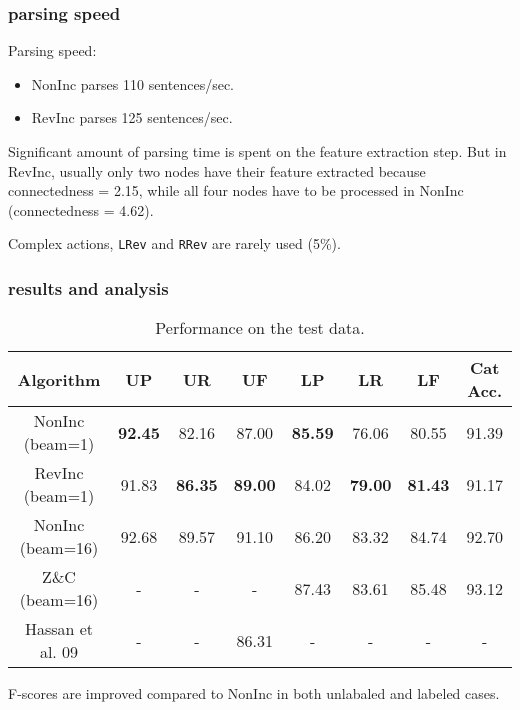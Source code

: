 \documentclass[10pt,usepdftitle=false,hyperref={unicode}]{beamer}
\begin{document}
\begin{frame}
    \frametitle{parsing speed}
    Parsing speed:
    \begin{itemize}
        \item NonInc parses 110 sentences/sec.
        \item RevInc parses 125 sentences/sec.
    \end{itemize}

    \bigskip

    Significant amount of parsing time is spent on the feature extraction step.
    But in RevInc, usually only two nodes have their feature extracted because connectedness = 2.15,
    while all four nodes have to be processed in NonInc (connectedness = 4.62).

    \smallskip

    Complex actions, \texttt{LRev} and \texttt{RRev} are rarely used (5\%).
\end{frame}

\begin{frame}
    \frametitle{results and analysis}
    \begingroup
    \scriptsize
    \begin{center}
    \begin{table}
        \caption{Performance on the test data.}
        \begin{tabular}{cccccccc}
            \toprule
            Algorithm        & UP             & UR             & UF             & LP             & LR             & LF             & Cat Acc. \\
            \midrule
            NonInc (beam=1)  & \textbf{92.45} & 82.16          & 87.00          & \textbf{85.59} & 76.06          & 80.55          & 91.39 \\
            RevInc (beam=1)  & 91.83          & \textbf{86.35} & \textbf{89.00} & 84.02          & \textbf{79.00} & \textbf{81.43} & 91.17 \\
            \midrule
            NonInc (beam=16) & 92.68          & 89.57          & 91.10          & 86.20          & 83.32          & 84.74          & 92.70 \\
            Z\&C (beam=16)   & -              & -              & -              & 87.43          & 83.61          & 85.48          & 93.12 \\
            Hassan et al. 09 & -              & -              & 86.31          & -              & -              & -              & -     \\
            \bottomrule
        \end{tabular}
    \end{table}
    \end{center}
    \endgroup

     F-scores are improved compared to NonInc in both unlabaled and labeled cases.
\end{frame}
\end{document}
